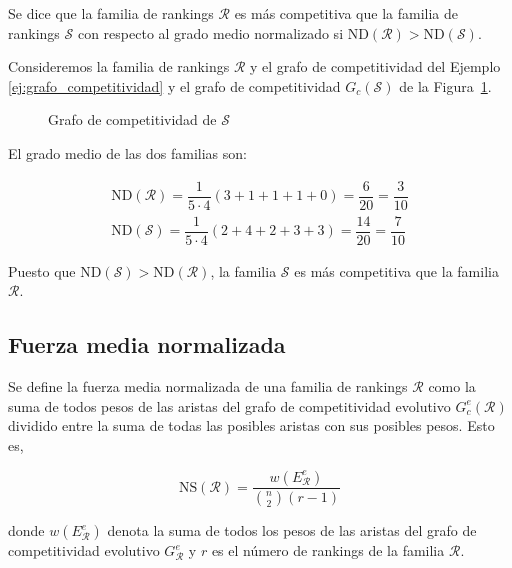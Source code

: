 \begin{defi}
Se dice que la familia de rankings $\mathcal{R}$ es más competitiva que la familia de rankings $\mathcal{S}$ con respecto al grado medio normalizado si $\mathrm{ND}(\mathcal{R}) > \mathrm{ND}(\mathcal{S})$.
\end{defi}

\begin{ejemplo}
Consideremos la familia de rankings $\mathcal{R}$ y el grafo de competitividad del Ejemplo~ \ref{ej:grafo_competitividad} y el grafo de competitividad $G_c(\mathcal{S})$ de la Figura~\ref{fig:grado_medio}.\\


\begin{figure}[htb]
\centering
\ejemplogradomedio
\caption{Grafo de competitividad de $\mathcal{S}$}
\label{fig:grado_medio}
\end{figure}

El grado medio de las dos familias son:

\begin{eqnarray*}
\mathrm{ND}(\mathcal{R}) = \dfrac{1}{5\cdot 4} (3 + 1 + 1 + 1 + 0) = \dfrac{6}{20} = \dfrac{3}{10}\\
\mathrm{ND}(\mathcal{S}) = \dfrac{1}{5\cdot 4} (2 + 4 + 2 + 3 + 3) = \dfrac{14}{20} = \dfrac{7}{10}
\end{eqnarray*}

Puesto que $\mathrm{ND}(\mathcal{S}) > \mathrm{ND}(\mathcal{R})$, la familia $\mathcal{S}$ es más competitiva que la familia $\mathcal{R}$.
\end{ejemplo}

\subsection*{Fuerza media normalizada}

\begin{defi}
Se define la fuerza media normalizada de una familia de rankings $\mathcal{R}$ como la suma de todos pesos de las aristas del grafo de competitividad evolutivo $G_c^e(\mathcal{R})$ dividido entre la suma de todas las posibles aristas con sus posibles pesos. Esto es,

\begin{equation}
\mathrm{NS}(\mathcal{R}) = \dfrac{w(E_\mathcal{R}^e)}{\binom{n}{2} (r-1)}
\end{equation} 

donde $w(E_\mathcal{R}^e)$ denota la suma de todos los pesos de las aristas del grafo de competitividad evolutivo $G_\mathcal{R}^e$ y $r$ es el número de rankings de la familia $\mathcal{R}$.
\end{defi}

